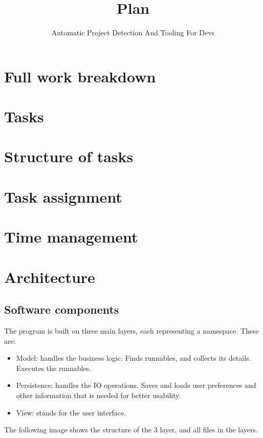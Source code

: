 \documentclass{article}
\title{Plan}
\author{Automatic Project Detection And Tooling For Devs}
\date{}
\begin{document}
\maketitle

\section{Full work breakdown}

\section{Tasks}

\section{Structure of tasks}

\section{Task assignment}

\section{Time management}

\newpage
\section{Architecture}

\subsection{Software components}

The program is built on three main layers, each representing a namespace. These are:
\begin{itemize}
    \item Model: handles the business logic. Finds runnables, and collects its details. Executes the runnables.
    \item Persistence: handles the IO operations. Saves and loads user preferences and other information that is needed for better usability.
    \item View: stands for the user interface.
\end{itemize}

The following image shows the structure of the 3 layer, and all files in the layers. 
\end{document}
